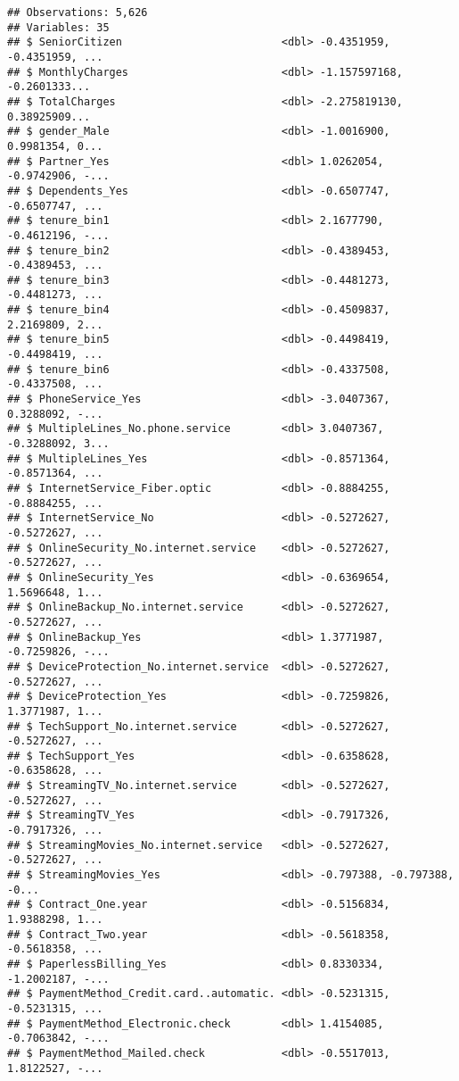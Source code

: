 \documentclass[]{article}
\begin{document}
\begin{verbatim}
## Observations: 5,626
## Variables: 35
## $ SeniorCitizen                         <dbl> -0.4351959, -0.4351959, ...
## $ MonthlyCharges                        <dbl> -1.157597168, -0.2601333...
## $ TotalCharges                          <dbl> -2.275819130, 0.38925909...
## $ gender_Male                           <dbl> -1.0016900, 0.9981354, 0...
## $ Partner_Yes                           <dbl> 1.0262054, -0.9742906, -...
## $ Dependents_Yes                        <dbl> -0.6507747, -0.6507747, ...
## $ tenure_bin1                           <dbl> 2.1677790, -0.4612196, -...
## $ tenure_bin2                           <dbl> -0.4389453, -0.4389453, ...
## $ tenure_bin3                           <dbl> -0.4481273, -0.4481273, ...
## $ tenure_bin4                           <dbl> -0.4509837, 2.2169809, 2...
## $ tenure_bin5                           <dbl> -0.4498419, -0.4498419, ...
## $ tenure_bin6                           <dbl> -0.4337508, -0.4337508, ...
## $ PhoneService_Yes                      <dbl> -3.0407367, 0.3288092, -...
## $ MultipleLines_No.phone.service        <dbl> 3.0407367, -0.3288092, 3...
## $ MultipleLines_Yes                     <dbl> -0.8571364, -0.8571364, ...
## $ InternetService_Fiber.optic           <dbl> -0.8884255, -0.8884255, ...
## $ InternetService_No                    <dbl> -0.5272627, -0.5272627, ...
## $ OnlineSecurity_No.internet.service    <dbl> -0.5272627, -0.5272627, ...
## $ OnlineSecurity_Yes                    <dbl> -0.6369654, 1.5696648, 1...
## $ OnlineBackup_No.internet.service      <dbl> -0.5272627, -0.5272627, ...
## $ OnlineBackup_Yes                      <dbl> 1.3771987, -0.7259826, -...
## $ DeviceProtection_No.internet.service  <dbl> -0.5272627, -0.5272627, ...
## $ DeviceProtection_Yes                  <dbl> -0.7259826, 1.3771987, 1...
## $ TechSupport_No.internet.service       <dbl> -0.5272627, -0.5272627, ...
## $ TechSupport_Yes                       <dbl> -0.6358628, -0.6358628, ...
## $ StreamingTV_No.internet.service       <dbl> -0.5272627, -0.5272627, ...
## $ StreamingTV_Yes                       <dbl> -0.7917326, -0.7917326, ...
## $ StreamingMovies_No.internet.service   <dbl> -0.5272627, -0.5272627, ...
## $ StreamingMovies_Yes                   <dbl> -0.797388, -0.797388, -0...
## $ Contract_One.year                     <dbl> -0.5156834, 1.9388298, 1...
## $ Contract_Two.year                     <dbl> -0.5618358, -0.5618358, ...
## $ PaperlessBilling_Yes                  <dbl> 0.8330334, -1.2002187, -...
## $ PaymentMethod_Credit.card..automatic. <dbl> -0.5231315, -0.5231315, ...
## $ PaymentMethod_Electronic.check        <dbl> 1.4154085, -0.7063842, -...
## $ PaymentMethod_Mailed.check            <dbl> -0.5517013, 1.8122527, -...
\end{verbatim}
\end{document}
